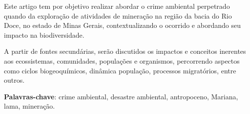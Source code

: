 \documentclass[
article,			%
11pt,				%
oneside,			%
a4paper,			%
english,			%
brazil,				%
sumario=tradicional
]{abntex2}
\begin{document}
	
	
	\frenchspacing 
	
	
	\maketitle
	
	\begin{resumoumacoluna}

		Este artigo tem por objetivo realizar abordar o crime ambiental perpetrado quando da exploração de atividades de mineração na região da bacia do Rio Doce, no estado de Minas Gerais, contextualizando o ocorrido e abordando seu impacto na biodiversidade.
		
		A partir de fontes secundárias, serão discutidos os impactos e conceitos inerentes aos ecossistemas, comunidades, populações e organismos, percorrendo aspectos como ciclos biogeoquímicos, dinâmica população, processos migratórios, entre outros.
		
		\vspace{\onelineskip}
		
		\noindent
		\textbf{Palavras-chave}: crime ambiental, desastre ambiental, antropoceno, Mariana, lama, mineração.
	\end{resumoumacoluna}
	
	
	\emptythanks
	\maketitle
	
\end{document}

